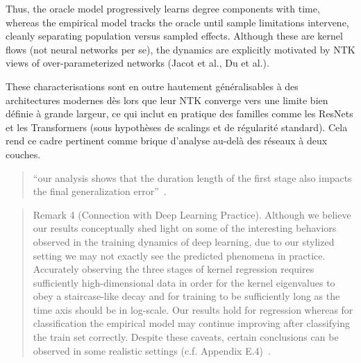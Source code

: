 \documentclass[12pt]{article}
\begin{document}
Thus, the oracle model progressively learns degree components with time, whereas the empirical model tracks the oracle until sample limitations intervene, cleanly separating population versus sampled effects. Although these are kernel flows (not neural networks per se), the dynamics are explicitly motivated by NTK views of over-parameterized networks (Jacot et al., Du et al.).

These characterisations sont en outre hautement généralisables à des architectures modernes dès lors que leur NTK converge vers une limite bien définie à grande largeur, ce qui inclut en pratique des familles comme les ResNets et les Transformers (sous hypothèses de scalings et de régularité standard). Cela rend ce cadre pertinent comme brique d’analyse au-delà des réseaux à deux couches.
\begin{quote}
\small
``our analysis shows that the duration length of the first stage also impacts the final generalization error''~\cite{ghosh2021stageslearningdynamicshighdimensional}.
\end{quote}

\begin{quote}
\small
Remark 4 (Connection with Deep Learning Practice). Although we believe our results conceptually shed light on some of the interesting behaviors observed in the training dynamics of deep learning, due to our stylized setting we may not exactly see the predicted phenomena in practice. Accurately observing the three stages of kernel regression requires sufficiently high-dimensional data in order for the kernel eigenvalues to obey a staircase-like decay and for training to be sufficiently long as the time axis should be in log-scale. Our results hold for regression whereas for classification the empirical model may continue improving after classifying the train set correctly. Despite these caveats, certain conclusions can be observed in some realistic settings (c.f. Appendix E.4)~\cite{ghosh2021stageslearningdynamicshighdimensional}.
\end{quote}
\end{document}
